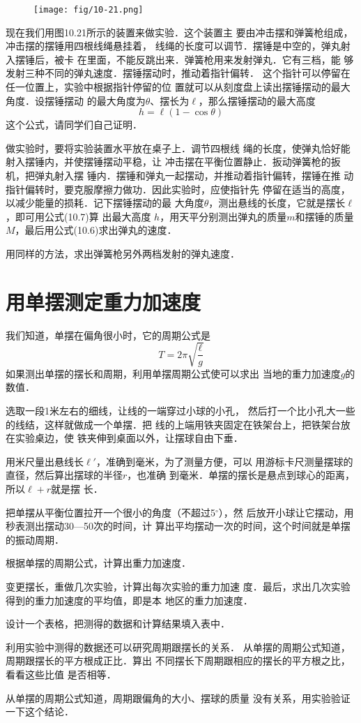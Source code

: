 \begin{figure}[htp]
    \centering
    \texttt{[image: fig/10-21.png]}
    \caption{}
\end{figure}

现在我们用图10.21所示的装置来做实验．这个装置主
要由冲击摆和弹簧枪组成，冲击摆的摆锤用四根线绳悬挂着，
线绳的长度可以调节．摆锤是中空的，弹丸射入摆锤后，被卡
在里面，不能反跳出来．弹簧枪用来发射弹丸．它有三档，能
够发射三种不同的弹丸速度．摆锤摆动时，推动着指针偏转．
这个指针可以停留在任一位置上，实验中根据指针停留的位
置就可以从刻度盘上读出摆锤摆动的最大角度．设摆锤摆动	
的最大角度为$\theta$、摆长为$\ell$，那么摆锤摆动的最大高度
\begin{equation}
    h=\ell(1-\cos\theta)
\end{equation}
这个公式，请同学们自己证明．

做实验时，要将实验装置水平放在桌子上．调节四根线
绳的长度，使弹丸恰好能射入摆锤内，并使摆锤摆动平稳，让
冲击摆在平衡位置静止．扳动弹簧枪的扳机，把弹丸射入摆
锤内．摆锤和弹丸一起摆动，并推动着指针偏转，摆锤在推
动指针偏转时，要克服摩擦力做功．因此实验时，应使指针先
停留在适当的高度，以减少能量的损耗．记下摆锤摆动的最
大角度$\theta$，测出悬线的长度，它就是摆长$\ell$，即可用公式(10.7)算
出最大高度 $h$，用天平分别测出弹丸的质量$m$和摆锤的质量
$M$，最后用公式(10.6)求出弹丸的速度．

用同样的方法，求出弹簧枪另外两档发射的弹丸速度．

\section{用单摆测定重力加速度}
我们知道，单摆在偏角很小时，它的周期公式是
\[T=2\pi\sqrt{\frac{\ell}{g}}  \]
如果测出单摆的摆长和周期，利用单摆周期公式使可以求出
当地的重力加速度$g$的数值．

选取一段1米左右的细线，让线的一端穿过小球的小孔，
然后打一个比小孔大一些的线结，这样就做成一个单摆．把
线的上端用铁夹固定在铁架台上，把铁架台放在实验桌边，使
铁夹伸到桌面以外，让摆球自由下垂．

用米尺量出悬线长$\ell'$，准确到毫米，为了测量方便，可以
用游标卡尺测量摆球的直径，然后算出摆球的半径$r$，也准确
到毫米．单摆的摆长是悬点到球心的距离，所以$\ell+r$就是摆
长．

把单摆从平衡位置拉开一个很小的角度（不超过5$^\circ$），然
后放开小球让它摆动，用秒表测出摆动30—50次的时间，计
算出平均摆动一次的时间，这个时间就是单摆的振动周期．

根据单摆的周期公式，计算出重力加速度．

变更摆长，重做几次实验，计算出每次实验的重力加速
度．最后，求出几次实验得到的重力加速度的平均值，即是本
地区的重力加速度．

设计一个表格，把测得的数据和计算结果填入表中．

利用实验中测得的数据还可以研究周期跟摆长的关系．
从单摆的周期公式知道，周期跟摆长的平方根成正比．算出
不同摆长下周期跟相应的摆长的平方根之比，看看这些比值
是否相等．

从单摆的周期公式知道，周期跟偏角的大小、摆球的质量
没有关系，用实验验证一下这个结论．


